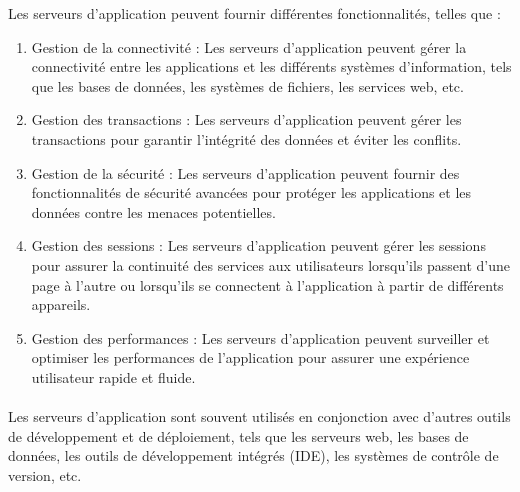 Les serveurs d'application peuvent fournir différentes fonctionnalités, telles que :
\begin{enumerate}
	 \item Gestion de la connectivité : Les serveurs d'application peuvent gérer la connectivité entre les applications et les différents systèmes d'information, tels que les bases de données, les systèmes de fichiers, les services web, etc.
	 
	 \item Gestion des transactions : Les serveurs d'application peuvent gérer les transactions pour garantir l'intégrité des données et éviter les conflits.
	 
	 \item Gestion de la sécurité : Les serveurs d'application peuvent fournir des fonctionnalités de sécurité avancées pour protéger les applications et les données contre les menaces potentielles.
	 
	 \item Gestion des sessions : Les serveurs d'application peuvent gérer les sessions pour assurer la continuité des services aux utilisateurs lorsqu'ils passent d'une page à l'autre ou lorsqu'ils se connectent à l'application à partir de différents appareils.
	 
	 \item Gestion des performances : Les serveurs d'application peuvent surveiller et optimiser les performances de l'application pour assurer une expérience utilisateur rapide et fluide.
	 
\end{enumerate}

\paragraph{ }
Les serveurs d'application sont souvent utilisés en conjonction avec d'autres outils de développement et de déploiement, tels que les serveurs web, les bases de données, les outils de développement intégrés (IDE), les systèmes de contrôle de version, etc.\\
